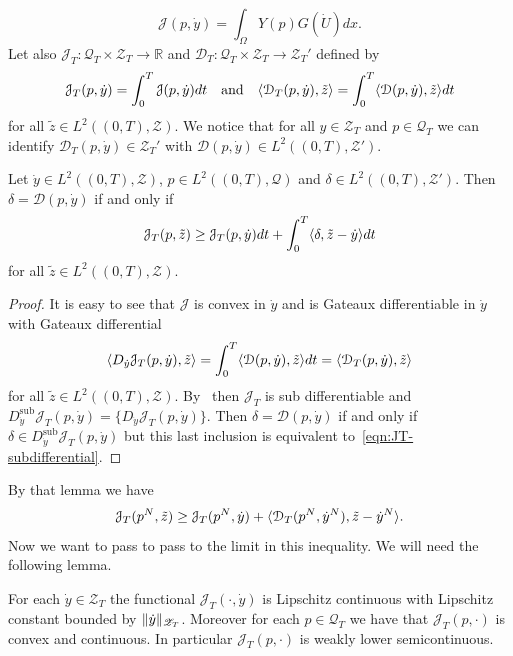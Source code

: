 \[
\mathcal{J}(p,\dot y)=\int_\Omega Y(p)G(\dot{U})dx.
\]
Let also $\mathscr{J}_T\colon\mathscr{Q}_T\times\mathscr{Z}_T\to\mathbb{R}$ and $\mathcal{D}_T\colon\mathscr{Q}_T\times\mathscr{Z}_T\to\mathscr{Z}_T'$ defined by
\[
\mathcal{J}_T(p,\dot y)=\int_0^T\mathcal{J}(p,\dot y)dt\quad\text{and}\quad\langle\mathcal{D}_T(p,\dot y),\tilde z\rangle=\int_0^T\langle\mathcal{D}(p,\dot y),\tilde z\rangle dt
\]
for all $\tilde z\in L^2((0,T),\mathscr{Z})$. We notice that for all $y\in\mathscr{Z}_T$ and $p\in\mathscr{Q}_T$ we can identify $\mathcal{D}_T(p,\dot y)\in\mathscr{Z}_T'$ with $\mathcal{D}(p,\dot y)\in L^2((0,T),\mathscr{Z}')$.
\begin{lemma}
Let $\dot y\in L^2((0,T),\mathscr{Z})$, $p\in L^2((0,T),\mathscr{Q})$ and $\delta\in L^2((0,T),\mathscr{Z}')$. Then $\delta=\mathcal{D}(p,\dot y)$ if and only if
\begin{equation}
\label{eqn:JT-subdifferential}
\mathcal{J}_T(p,\tilde z)\ge\mathcal{J}_T(p,\dot y)dt+\int_0^T\langle\delta,\tilde z-\dot y\rangle dt
\end{equation}
for all $\tilde z\in L^2((0,T),\mathscr{Z})$.
\end{lemma}
\begin{proof}
It is easy to see that $\mathcal{J}$ is convex in $\dot y$ and is Gateaux differentiable in $\dot y$ with Gateaux differential
\[
\langle D_{\dot y}\mathcal{J}_T(p,\dot y),\tilde z\rangle=\int_0^T\langle\mathcal{D}(p,\dot y),\tilde z\rangle dt=\langle\mathcal{D}_T(p,\dot y),\tilde z\rangle
\]
for all $\tilde z\in L^2((0,T),\mathscr{Z})$. By~\cite[Proposition 5.3]{ekeland-temam} then $\mathcal{J}_T$ is sub differentiable and $D^\text{sub}_{\dot y}\mathcal{J}_T(p,\dot y)=\{D_{\dot y}\mathcal{J}_T(p,\dot y)\}$. Then $\delta=\mathcal{D}(p,\dot y)$ if and only if $\delta\in D^\text{sub}_{\dot y}\mathcal{J}_T(p,\dot y)$ but this last inclusion is equivalent to~\eqref{eqn:JT-subdifferential}.
\end{proof}
By that lemma we have
\begin{equation}
\label{eqn:subdiff-discrete}
\mathcal{J}_T(p^N,\tilde z)\ge\mathcal{J}_T(p^N,\dot y)+\langle\mathcal{D}_T(p^N,\dot y^N),\tilde z-\dot y^N\rangle.
\end{equation}
Now we want to pass to pass to the limit in this inequality. We will need the following lemma.
\begin{lemma}
For each $\dot y\in\mathscr{Z}_T$ the functional $\mathcal{J}_T(\cdot,\dot y)$ is Lipschitz continuous with Lipschitz constant bounded by $\lVert\dot y\rVert_{\mathscr{Z}_T}$. Moreover for each $p\in\mathscr{Q}_T$ we have that $\mathcal{J}_T(p,\cdot)$ is convex and continuous. In particular $\mathcal{J}_T(p,\cdot)$ is weakly lower semicontinuous.
\end{lemma}
